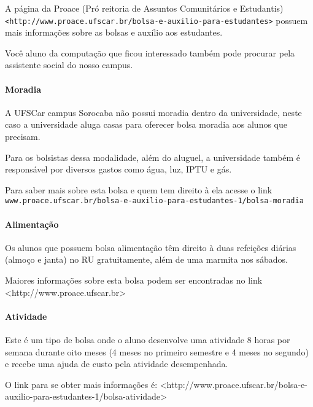 A página da Proace (Pró reitoria de Assuntos Comunitários e Estudantis) \texttt{<http://www.proace.ufscar.br/bolsa-e-auxilio-para-estudantes>} possuem mais informações sobre as bolsas e auxílio aos estudantes.

Você aluno da computação que ficou interessado também pode procurar pela assistente social do nosso campus.

\paragraph{Moradia}\label{moradia}
A UFSCar campus Sorocaba não possui moradia dentro da universidade, neste caso a universidade aluga casas para oferecer bolsa moradia aos alunos que precisam.

Para os bolsistas dessa modalidade, além do aluguel, a universidade também é responsável por diversos gastos como água, luz, IPTU e gás. 

Para saber mais sobre esta bolsa e quem tem direito à ela acesse o link \texttt{www.proace.ufscar.br/bolsa-e-auxilio-para-estudantes-1/bolsa-moradia}

\paragraph{Alimentação}
Os alunos que possuem bolsa alimentação têm direito à duas refeições diárias (almoço e janta) no RU gratuitamente, além de uma marmita nos sábados. 

Maiores informações sobre esta bolsa podem ser encontradas no link <http://www.proace.ufscar.br>

\paragraph{Atividade}
Este é um tipo de bolsa onde o aluno desenvolve uma atividade 8 horas por semana durante oito meses (4 meses no primeiro semestre e 4 meses no segundo) e recebe uma ajuda de custo pela atividade desempenhada.

O link para se obter mais informações é:
\newline <http://www.proace.ufscar.br/bolsa-e-auxilio-para-estudantes-1/bolsa-atividade>
